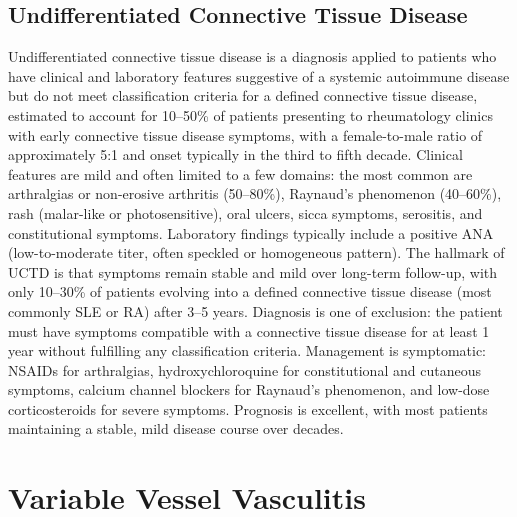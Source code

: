 \subsection{Undifferentiated Connective Tissue Disease}
\label{sec:Undifferentiated Connective Tissue Disease}
Undifferentiated connective tissue disease is a diagnosis applied to patients who have clinical and laboratory features suggestive of a systemic autoimmune disease but do not meet classification criteria for a defined connective tissue disease, estimated to account for 10--50\% of patients presenting to rheumatology clinics with early connective tissue disease symptoms, with a female-to-male ratio of approximately 5:1 and onset typically in the third to fifth decade. Clinical features are mild and often limited to a few domains: the most common are arthralgias or non-erosive arthritis (50--80\%), Raynaud's phenomenon (40--60\%), rash (malar-like or photosensitive), oral ulcers, sicca symptoms, serositis, and constitutional symptoms. Laboratory findings typically include a positive ANA (low-to-moderate titer, often speckled or homogeneous pattern). The hallmark of UCTD is that symptoms remain stable and mild over long-term follow-up, with only 10--30\% of patients evolving into a defined connective tissue disease (most commonly SLE or RA) after 3--5 years. Diagnosis is one of exclusion: the patient must have symptoms compatible with a connective tissue disease for at least 1 year without fulfilling any classification criteria. Management is symptomatic: NSAIDs for arthralgias, hydroxychloroquine for constitutional and cutaneous symptoms, calcium channel blockers for Raynaud's phenomenon, and low-dose corticosteroids for severe symptoms. Prognosis is excellent, with most patients maintaining a stable, mild disease course over decades.

\section{Variable Vessel Vasculitis}





